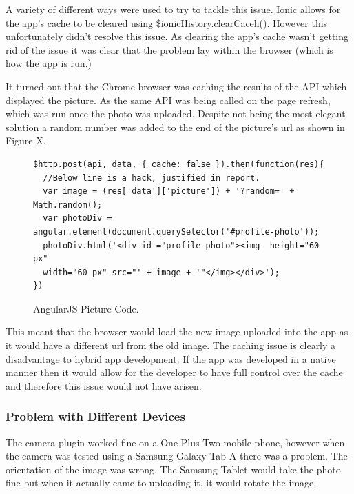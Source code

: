 A variety of different ways were used to try to tackle this issue. Ionic allows for the app's cache to be cleared using \$ionicHistory.clearCaceh(). However this unfortunately didn't resolve this issue. As clearing the app's cache wasn't getting rid of the issue it was clear that the problem lay within the browser (which is how the app is run.)

It turned out that the Chrome browser was caching the results of the API which displayed the picture. As the same API was being called on the page refresh, which was run once the photo was uploaded. Despite not being the most elegant solution a random number was added to the end of the picture's url as shown in Figure X.
\begin{center}
\begin{figure}[H]
\begin{verbatim}
$http.post(api, data, { cache: false }).then(function(res){
  //Below line is a hack, justified in report.
  var image = (res['data']['picture']) + '?random=' + Math.random();
  var photoDiv = angular.element(document.querySelector('#profile-photo'));
  photoDiv.html('<div id ="profile-photo"><img  height="60 px" 
  width="60 px" src="' + image + '"</img></div>');
})
\end{verbatim}
\caption{AngularJS Picture Code.}
\end{figure}
\end{center}

This meant that the browser would load the new image uploaded into the app as it would have a different url from the old image. The caching issue is clearly a disadvantage to hybrid app development. If the app was developed in a native manner then it would allow for the developer to have full control over the cache and therefore this issue would not have arisen. 

\subsubsection{Problem with Different Devices}
The camera plugin worked fine on a One Plus Two mobile phone, however when the camera was tested using a Samsung Galaxy Tab A there was a problem. The orientation of the image was wrong. The Samsung Tablet would take the photo fine but when it actually came to uploading it, it would rotate the image. 

